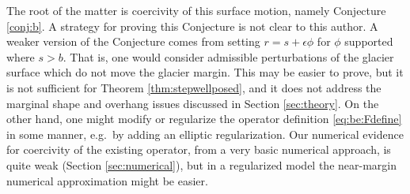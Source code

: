 \documentclass[hidelinks,onefignum,onetabnum,final]{siamart220329}  %
\newcommand{\eps}{\epsilon}
\begin{document}
The root of the matter is coercivity of this surface motion, namely Conjecture \ref{conj:b}.  A strategy for proving this Conjecture is not clear to this author.  A weaker version of the Conjecture comes from setting $r=s + \eps\phi$ for $\phi$ supported where $s>b$.  That is, one would consider admissible perturbations of the glacier surface which do not move the glacier margin.  This may be easier to prove, but it is not sufficient for Theorem \ref{thm:stepwellposed}, and it does not address the marginal shape and overhang issues discussed in Section \ref{sec:theory}.  On the other hand, one might modify or regularize the operator definition \eqref{eq:be:Fdefine} in some manner, e.g.~by adding an elliptic regularization.  Our numerical evidence for coercivity of the existing operator, from a very basic numerical approach, is quite weak (Section \ref{sec:numerical}), but in a regularized model the near-margin numerical approximation might be easier.

\clearpage\newpage


\end{document}
